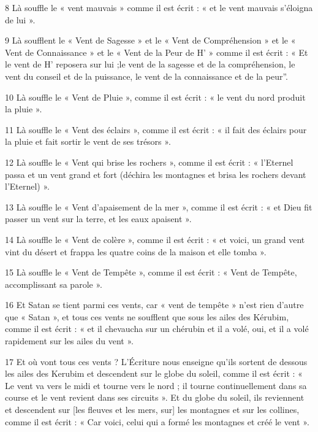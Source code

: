 \par 8 Là souffle le « vent mauvais » comme il est écrit : « et le vent mauvais s'éloigna de lui ».

\par 9 Là soufflent le « Vent de Sagesse » et le « Vent de Compréhension » et le « Vent de Connaissance » et le « Vent de la Peur de H' » comme il est écrit : « Et le vent de H' reposera sur lui ;le vent de la sagesse et de la compréhension, le vent du conseil et de la puissance, le vent de la connaissance et de la peur”.

\par 10 Là souffle le « Vent de Pluie », comme il est écrit : « le vent du nord produit la pluie ».

\par 11 Là souffle le « Vent des éclairs », comme il est écrit : « il fait des éclairs pour la pluie et fait sortir le vent de ses trésors ».

\par 12 Là souffle le « Vent qui brise les rochers », comme il est écrit : « l'Eternel passa et un vent grand et fort (déchira les montagnes et brisa les rochers devant l'Eternel) ».

\par 13 Là souffle le « Vent d'apaisement de la mer », comme il est écrit : « et Dieu fit passer un vent sur la terre, et les eaux apaisent ».

\par 14 Là souffle le « Vent de colère », comme il est écrit : « et voici, un grand vent vint du désert et frappa les quatre coins de la maison et elle tomba ».

\par 15 Là souffle le « Vent de Tempête », comme il est écrit : « Vent de Tempête, accomplissant sa parole ».

\par 16 Et Satan se tient parmi ces vents, car « vent de tempête » n'est rien d'autre que « Satan », et tous ces vents ne soufflent que sous les ailes des Kérubim, comme il est écrit : « et il chevaucha sur un chérubin et il a volé, oui, et il a volé rapidement sur les ailes du vent ».

\par 17 Et où vont tous ces vents ? L'Écriture nous enseigne qu'ils sortent de dessous les ailes des Kerubim et descendent sur le globe du soleil, comme il est écrit : « Le vent va vers le midi et tourne vers le nord ; il tourne continuellement dans sa course et le vent revient dans ses circuits ». Et du globe du soleil, ils reviennent et descendent sur [les fleuves et les mers, sur] les montagnes et sur les collines, comme il est écrit : « Car voici, celui qui a formé les montagnes et créé le vent ».

